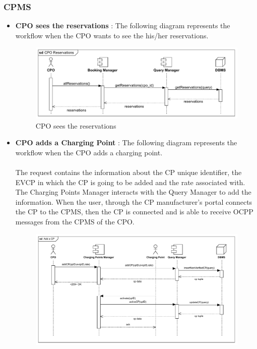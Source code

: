 \subsubsection{CPMS}
\begin{itemize}
    \item \textbf{CPO sees the reservations} : The following diagram represents the workflow when the CPO wants to see the his/her reservations.\\
    \begin{figure}[H]
        \centering
        \includegraphics[scale=0.55]{src/runtimeVIew/CPMS_Reservations.pdf}
        \caption{CPO sees the reservations}
    \end{figure}
    \pagebreak
    \item \textbf{CPO adds a Charging Point} : The following diagram represents the workflow when the CPO adds a charging point.\\
    \\ The request contains the information about the CP unique identifier, the EVCP in which the CP is going to be added and the rate associated with.
   The Charging Points Manager interacts with the Query Manager to add the information. When the user, through the CP manufacturer's portal connects the 
    CP to the CPMS, then the CP is connected and is able to receive OCPP messages from the CPMS of the CPO.
    \begin{figure}[H]
        \centering
        \includegraphics[scale=0.55]{src/runtimeVIew/CPMS_AddCP.pdf}

\end{figure}
\end{itemize}
